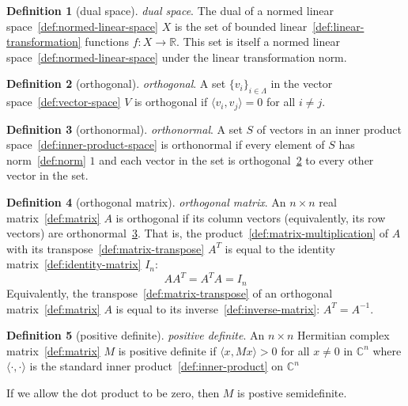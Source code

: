 \documentclass[12pt,a4paper]{article}
\theoremstyle{definition}
\newtheorem{definition}{Definition}
\begin{document}
\begin{definition}[dual space]\label{def:dual-space}
\emph{dual space}. The dual of a normed linear space~\ref{def:normed-linear-space} $X$ is the set of bounded linear~\ref{def:linear-transformation} functions $f: X\to \mathbb R$. This set is itself a normed linear space~\ref{def:normed-linear-space} under the linear transformation norm.
\end{definition}

\begin{definition}[orthogonal]\label{def:orthogonal}
\emph{orthogonal}. A set $\{v_i\}_{i\in \Lambda}$ in the vector space~\ref{def:vector-space} $V$ is orthogonal if $\langle v_i, v_j\rangle =0$ for all $i\neq j$.
\end{definition}

\begin{definition}[orthonormal]\label{def:orthonormal}
\emph{orthonormal}. A set $S$ of vectors in an inner product space~\ref{def:inner-product-space} is orthonormal if every element of $S$ has norm~\ref{def:norm} $1$ and each vector in the set is orthogonal~\ref{def:orthogonal} to every other vector in the set.
\end{definition}

\begin{definition}[orthogonal matrix]\label{def:orthogonal-matrix}
\emph{orthogonal matrix}. An $n\times n$ real matrix~\ref{def:matrix} $A$ is orthogonal if its column vectors (equivalently, its row vectors) are orthonormal~\ref{def:orthonormal}. That is, the product~\ref{def:matrix-multiplication} of $A$ with its transpose~\ref{def:matrix-transpose} $A^T$ is equal to the identity matrix~\ref{def:identity-matrix} $I_n$: $$AA^T = A^TA = I_n$$
Equivalently, the transpose~\ref{def:matrix-transpose} of an orthogonal matrix~\ref{def:matrix} $A$ is equal to its inverse~\ref{def:inverse-matrix}: $A^T = A^{-1}$.
\end{definition}

\begin{definition}[positive definite]\label{def:positive-definite}
\emph{positive definite}. An $n\times n$ Hermitian complex matrix~\ref{def:matrix} $M$ is positive definite if $\langle x, Mx\rangle > 0$ for all $x\neq 0$ in $\mathbb C^n$ where $\langle\cdot,\cdot\rangle$ is the standard inner product~\ref{def:inner-product} on $\mathbb C^n$

If we allow the dot product to be zero, then $M$ is postive semidefinite.
\end{definition}
\end{document}
